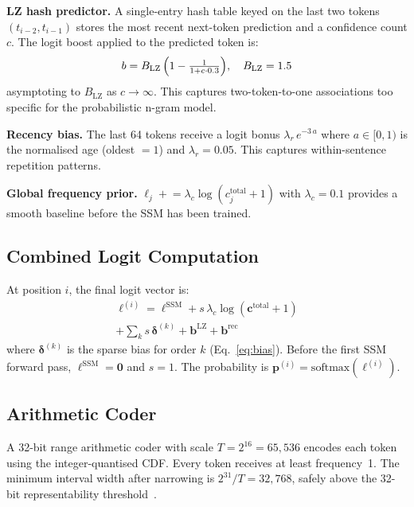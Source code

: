 \documentclass[10pt,twocolumn]{article}
\begin{document}
\textbf{LZ hash predictor.}
A single-entry hash table keyed on the last two tokens
$(t_{i-2},t_{i-1})$ stores the most recent next-token prediction
and a confidence count $c$.  The logit boost applied to the
predicted token is:
\begin{equation}
  b = B_\mathrm{LZ}\,\Bigl(1 - \tfrac{1}{1+c\cdot0.3}\Bigr),
  \quad B_\mathrm{LZ}=1.5
\end{equation}
asymptoting to $B_\mathrm{LZ}$ as $c\to\infty$.  This captures
two-token-to-one associations too specific for the probabilistic
n-gram model.

\textbf{Recency bias.}
The last 64 tokens receive a logit bonus
$\lambda_r\,e^{-3\,a}$ where $a\in[0,1)$ is the normalised age
(oldest $=1$) and $\lambda_r=0.05$.  This captures
within-sentence repetition patterns.

\textbf{Global frequency prior.}
$\ell_j \mathrel{+}= \lambda_c\log(c_j^\text{total}+1)$ with
$\lambda_c=0.1$ provides a smooth baseline before the SSM has been
trained.

\subsection{Combined Logit Computation}

At position $i$, the final logit vector is:
\begin{multline}
  \boldsymbol{\ell}^{(i)} =
    \boldsymbol{\ell}^\mathrm{SSM}
    + s\,\lambda_c\log(\mathbf{c}^\text{total}\!+\!1)\\
    + \textstyle\sum_{k} s\,\boldsymbol{\delta}^{(k)}
    + \mathbf{b}^\mathrm{LZ}
    + \mathbf{b}^\mathrm{rec}
  \label{eq:combined}
\end{multline}
where $\boldsymbol{\delta}^{(k)}$ is the sparse bias for order $k$
(Eq.~\ref{eq:bias}).  Before the first SSM forward pass, $\boldsymbol{\ell}^\mathrm{SSM}=\mathbf{0}$
and $s=1$.  The probability is $\mathbf{p}^{(i)}=\mathrm{softmax}(\boldsymbol{\ell}^{(i)})$.

\subsection{Arithmetic Coder}
\label{sec:ac}

A 32-bit range arithmetic coder with scale $T=2^{16}=65{,}536$
encodes each token using the integer-quantised CDF.  Every token
receives at least frequency~1.  The minimum interval width after
narrowing is $2^{31}/T=32{,}768$, safely above the 32-bit
representability threshold~\citep{witten1987}.
\end{document}
